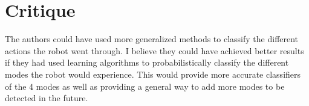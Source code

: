 \documentclass{article}
\begin{document}
\section*{Critique}
The authors could have used more generalized methods to classify the different actions the robot went through. I believe they could have achieved better results if they had used learning algorithms to probabilistically classify the different modes the robot would experience. This would provide more accurate classifiers of the 4 modes as well as providing a general way to add more modes to be detected in the future.
\cite{6251676}
\end{document}
